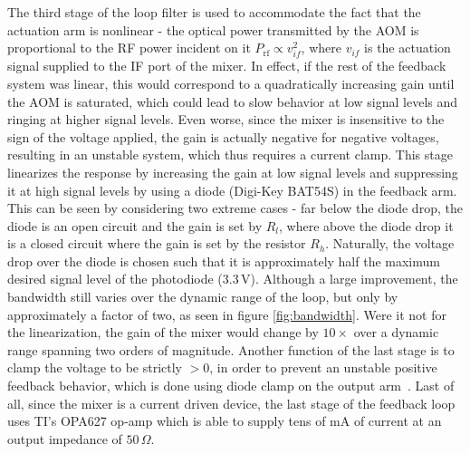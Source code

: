 \documentclass[twocolumn,aps,pra,showpacs,preprintnumbers,bibnotes]{revtex4-1}
\begin{document}
The third stage of the loop filter is used to accommodate the fact that the actuation arm is nonlinear - the optical power transmitted by the AOM is proportional to the RF power incident on it $P_{\mathrm{rf}}\propto v_{if}^2$, where $v_{if}$ is the actuation signal supplied to the IF port of the mixer.
In effect, if the rest of the feedback system was linear, this would correspond to a quadratically increasing gain until the AOM is saturated, which could lead to slow behavior at low signal levels and ringing at higher signal levels.
Even worse, since the mixer is insensitive to the sign of the voltage applied, the gain is actually negative for negative voltages, resulting in an unstable system, which thus requires a current clamp.
This stage linearizes the response by increasing the gain at low signal levels and suppressing it at high signal levels by using a diode (Digi-Key BAT54S) in the feedback arm.
This can be seen by considering two extreme cases - far below the diode drop, the diode is an open circuit and the gain is set by $R_l$, where above the diode drop it is a closed circuit where the gain is set by the resistor $R_h$. 
Naturally, the voltage drop over the diode is chosen such that it is approximately half the maximum desired signal level of the photodiode ($3.3\,$V).
Although a large improvement, the bandwidth still varies over the dynamic range of the loop, but only by approximately a factor of two, as seen in figure \ref{fig:bandwidth}.
Were it not for the linearization, the gain of the mixer would change by $10\times$ over a dynamic range spanning two orders of magnitude.
Another function of the last stage is to clamp the voltage to be strictly $>0$, in order to prevent an unstable positive feedback behavior, which is done using diode clamp on the output arm~\cite{Horowitz2015}.
Last of all, since the mixer is a current driven device, the last stage of the feedback loop uses TI's OPA627 op-amp which is able to supply tens of mA of current at an output impedance of $50\,\Omega$.
\end{document}
